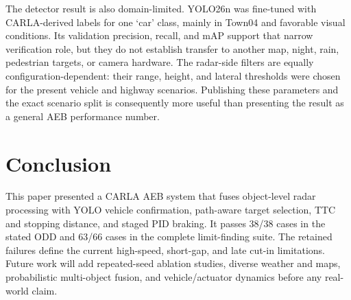 \documentclass[conference]{IEEEtran}
\begin{document}
The detector result is also domain-limited. YOLO26n was fine-tuned with
CARLA-derived labels for one `car' class, mainly in Town04 and favorable visual
conditions. Its validation precision, recall, and mAP support that narrow
verification role, but they do not establish transfer to another map, night,
rain, pedestrian targets, or camera hardware. The radar-side filters are equally
configuration-dependent: their range, height, and lateral thresholds were chosen
for the present vehicle and highway scenarios. Publishing these parameters and
the exact scenario split is consequently more useful than presenting the result
as a general AEB performance number.

\section{Conclusion}
This paper presented a CARLA AEB system that fuses object-level radar processing
with YOLO vehicle confirmation, path-aware target selection, TTC and stopping
distance, and staged PID braking. It passes 38/38 cases in the stated ODD and
63/66 cases in the complete limit-finding suite. The retained failures define
the current high-speed, short-gap, and late cut-in limitations. Future work will
add repeated-seed ablation studies, diverse weather and maps, probabilistic
multi-object fusion, and vehicle/actuator dynamics before any real-world claim.

\balance


\end{document}
